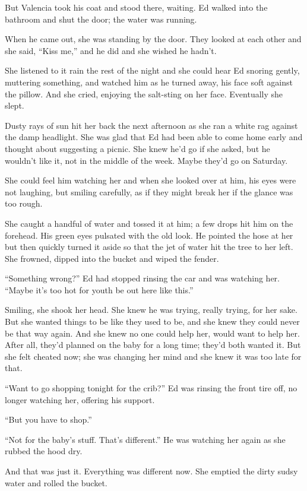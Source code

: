 \documentclass[twoside,10pt]{book}
\begin{document}
But Valencia took his coat and stood there, waiting. Ed walked into the
bathroom and shut the door; the water was running.

When he came out, she was standing by the door. They looked at each
other and she said, ``Kiss me,'' and he did and she wished he hadn't.

She listened to it rain the rest of the night and she could hear Ed
snoring gently, muttering something, and watched him as he turned away,
his face soft against the pillow. And she cried, enjoy­ing the
salt-sting on her face. Eventually she slept.

Dusty rays of sun hit her back the next afternoon as she ran a white rag
against the damp head­light. She was glad that Ed had been able to come
home early and thought about suggesting a picnic. She knew he'd go if
she asked, but he wouldn't like it, not in the middle of the week. Maybe
they'd go on Saturday.

She could feel him watching her and when she looked over at him, his
eyes were not laughing, but smiling carefully, as if they might break
her if the glance was too rough.

She caught a handful of water and tossed it at him; a few drops hit him
on the forehead. His green eyes pulsated with the old look. He pointed
the hose at her but then quickly turned it aside so that the jet of
water hit the tree to her left. She frowned, dipped into the bucket and
wiped the fender.

``Something wrong?'' Ed had stopped rinsing the car and was watching
her. ``Maybe it's too hot for youth be out here like this.''

Smiling, she shook her head. She knew he was trying, really trying, for
her sake. But she wanted things to be like they used to be, and she knew
they could never be that way again. And she knew no one could help her,
would want to help her. After all, they'd planned on the baby for a long
time; they'd both wanted it. But she felt cheated now; she was changing
her mind and she knew it was too late for that.

``Want to go shopping tonight for the crib?'' Ed was rinsing the front
tire off, no longer watch­ing her, offering his support.

``But you have to shop.''

``Not for the baby's stuff. That's different.'' He was watching her
again as she rubbed the hood dry.

And that was just it. Everything was different now. She emptied the
dirty sudsy water and rolled the bucket.
\end{document}
